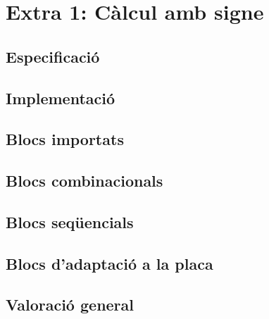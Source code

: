 \chapter{Extra 1: Càlcul amb signe}

\section{Especificació}

\section{Implementació}


\section{Blocs importats}

\section{Blocs combinacionals}

\section{Blocs seqüencials}

\section{Blocs d'adaptació a la placa}

\section{Valoració general}


